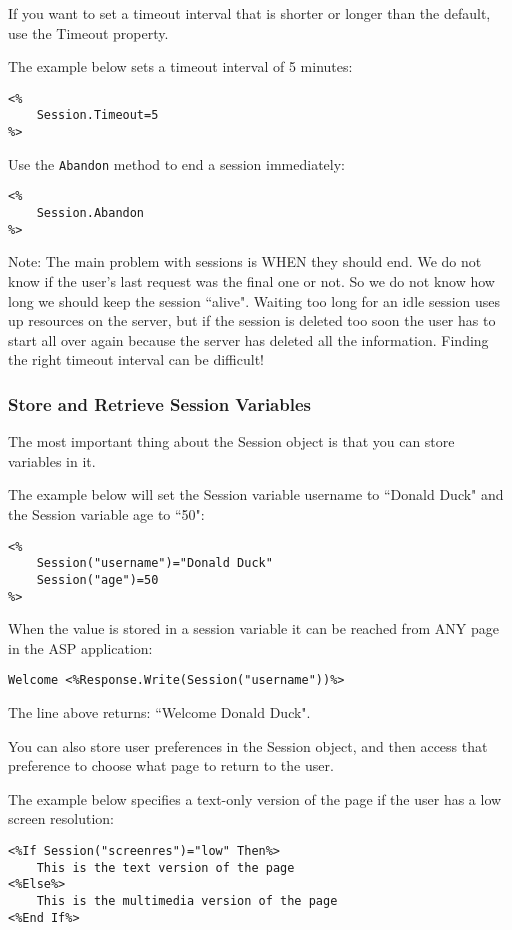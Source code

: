 If you want to set a timeout interval that is shorter or longer than the default, use the Timeout property.

The example below sets a timeout interval of 5 minutes:

\begin{lstlisting}
<%
	Session.Timeout=5
%>
\end{lstlisting}

Use the \verb*|Abandon| method to end a session immediately:
\begin{lstlisting}
<%
	Session.Abandon
%>
\end{lstlisting}

Note: The main problem with sessions is WHEN they should end. We do not know if the user's last request was the final one or not. So we do not know how long we should keep the session ``alive". Waiting too long for an idle session uses up resources on the server, but if the session is deleted too soon the user has to start all over again because the server has deleted all the information. Finding the right timeout interval can be difficult!

\subsubsection*{Store and Retrieve Session Variables }
The most important thing about the Session object is that you can store variables in it.

The example below will set the Session variable username to ``Donald Duck" and the Session variable age to ``50":
\begin{lstlisting}
<%
	Session("username")="Donald Duck"
	Session("age")=50
%>
\end{lstlisting}
When the value is stored in a session variable it can be reached from ANY page in the ASP application:
\begin{lstlisting}
Welcome <%Response.Write(Session("username"))%>
\end{lstlisting}

The line above returns: ``Welcome Donald Duck".

You can also store user preferences in the Session object, and then access that preference to choose what page to return to the user.

The example below specifies a text-only version of the page if the user has a low screen resolution: 
\begin{lstlisting}
<%If Session("screenres")="low" Then%>
	This is the text version of the page
<%Else%>
	This is the multimedia version of the page
<%End If%>
\end{lstlisting}

